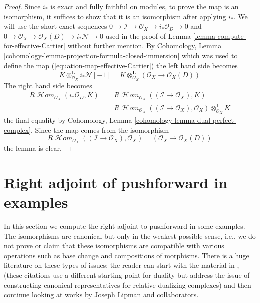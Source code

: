 \documentclass{stacks-project}
\theoremstyle{plain}
\theoremstyle{definition}
\theoremstyle{remark}
\numberwithin{equation}{subsection}
\def\SheafHom{\mathop{\mathcal{H}\!\mathit{om}}\nolimits}
\begin{document}
\begin{proof}
Since $i_*$ is exact and fully faithful on modules, to prove the map is an
isomorphism, it suffices to show that it is an isomorphism after applying
$i_*$. We will use the short exact sequences
$0 \to \mathcal{I} \to \mathcal{O}_X \to i_*\mathcal{O}_D \to 0$
and
$0 \to \mathcal{O}_X \to \mathcal{O}_X(D) \to i_*\mathcal{N} \to 0$
used in the proof of Lemma \ref{lemma-compute-for-effective-Cartier}
without further mention. By
Cohomology, Lemma \ref{cohomology-lemma-projection-formula-closed-immersion}
which was used to define the map (\ref{equation-map-effective-Cartier})
the left hand side becomes
$$
K \otimes_{\mathcal{O}_X}^\mathbf{L} i_*\mathcal{N}[-1] =
K \otimes_{\mathcal{O}_X}^\mathbf{L} (\mathcal{O}_X \to \mathcal{O}_X(D))
$$
The right hand side becomes
\begin{align*}
R\SheafHom_{\mathcal{O}_X}(i_*\mathcal{O}_D, K) & =
R\SheafHom_{\mathcal{O}_X}((\mathcal{I} \to \mathcal{O}_X), K) \\
& =
R\SheafHom_{\mathcal{O}_X}((\mathcal{I} \to \mathcal{O}_X), \mathcal{O}_X)
\otimes_{\mathcal{O}_X}^\mathbf{L} K
\end{align*}
the final equality by
Cohomology, Lemma \ref{cohomology-lemma-dual-perfect-complex}.
Since the map comes from the isomorphism
$$
R\SheafHom_{\mathcal{O}_X}((\mathcal{I} \to \mathcal{O}_X), \mathcal{O}_X)
= (\mathcal{O}_X \to \mathcal{O}_X(D))
$$
the lemma is clear.
\end{proof}





\section{Right adjoint of pushforward in examples}
\label{section-examples}

\noindent
In this section we compute the right adjoint to pushforward in
some examples. The isomorphisms are canonical but only in the weakest
possible sense, i.e., we do not prove or claim that these isomorphisms are
compatible with various operations such as base change and compositions
of morphisms. There is a huge literature on these types of issues; the reader
can start with the material in \cite{RD}, \cite{Conrad-GD}
(these citations use a different starting point for duality but address the
issue of constructing canonical representatives for relative dualizing
complexes) and then continue looking at works by
Joseph Lipman and collaborators.
\end{document}
